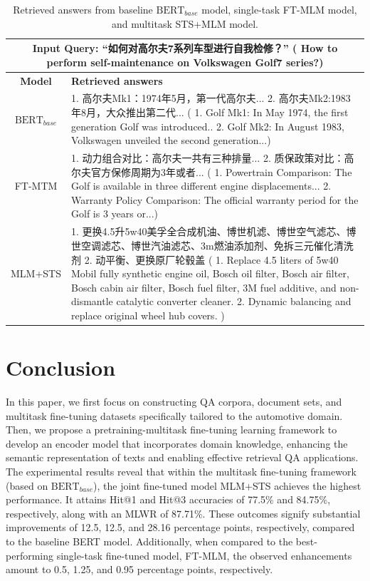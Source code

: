 \documentclass[mathematics,article,submit,moreauthors]{Definitions/mdpi}
\newcommand{\1}[1]{\mathds{1}\left[#1\right]}
\begin{document}
\begin{table}[H] 
	\caption{Retrieved answers from baseline $\text{BERT}_{base}$ model, single-task FT-MLM model, and multitask STS+MLM model.} \label{tab:case}
	\begin{tabularx}{\textwidth}{cp{10cm}}
		\toprule
		\multicolumn{2}{p{12cm}}{\hangindent=2.2cm \hangafter=1 \textbf{Input Query}: ``如何对高尔夫7系列车型进行自我检修？'' ({\color{blue} How to perform self-maintenance on Volkswagen Golf7 series?})}   \\
		\midrule
		\textbf{Model} & \textbf{Retrieved answers} \\ \midrule
		$\text{BERT}_{base}$  &  1. 高尔夫Mk1：1974年5月，第一代高尔夫... 2. 高尔夫Mk2:1983年8月，大众推出第二代... ({\color{blue} 1. Golf Mk1: In May 1974, the first generation Golf was introduced..  2. Golf Mk2: In August 1983, Volkswagen unveiled the second generation...})  \\\midrule
		FT-MTM  &       1. 动力组合对比：高尔夫一共有三种排量...	 2. 质保政策对比：高尔夫官方保修周期为3年或者...
		  ({\color{blue} 1. Powertrain Comparison: The Golf is available in three different engine displacements... 2. Warranty Policy Comparison: The official warranty period for the Golf is 3 years or...})   \\ \midrule
		MLM+STS  &   1. 更换4.5升5w40美孚全合成机油、博世机滤、博世空气滤芯、博世空调滤芯、博世汽油滤芯、3m燃油添加剂、免拆三元催化清洗剂
2. 动平衡、更换原厂轮毂盖
		 ({\color{blue} 1. Replace 4.5 liters of 5w40 Mobil fully synthetic engine oil, Bosch oil filter, Bosch air filter, Bosch cabin air filter, Bosch fuel filter, 3M fuel additive, and non-dismantle catalytic converter cleaner.  2. Dynamic balancing and replace original wheel hub covers. }) \\
		\bottomrule
	\end{tabularx}
\end{table}


\section{Conclusion}
In this paper, we first focus on constructing QA corpora, document sets, and multitask fine-tuning datasets specifically tailored to the automotive domain. Then, we propose a pretraining-multitask fine-tuning learning framework to develop an encoder model that incorporates domain knowledge, enhancing the semantic representation of texts and enabling effective retrieval QA applications. The experimental results reveal that within the multitask fine-tuning framework (based on $\text{BERT}_{base}$), the joint fine-tuned model MLM+STS achieves the highest performance. It attains Hit@1 and Hit@3 accuracies of 77.5\% and 84.75\%, respectively, along with an MLWR of 87.71\%. These outcomes signify substantial improvements of 12.5, 12.5, and 28.16 percentage points, respectively, compared to the baseline BERT model. Additionally, when compared to the best-performing single-task fine-tuned model, FT-MLM, the observed enhancements amount to 0.5, 1.25, and 0.95 percentage points, respectively.
\end{document}
